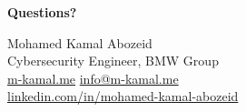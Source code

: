 \begin{frame}[plain]
  \centering
  {\Huge\bfseries\color{tumblue} Questions?}

  \vspace{1cm}
  {\large Mohamed Kamal Abozeid}\\
  {\small Cybersecurity Engineer, BMW Group}\\[4pt]
  {\small \url{m-kamal.me} \;\textbullet\; \href{mailto:info@m-kamal.me}{info@m-kamal.me}}\\[4pt]
  {\small \href{https://www.linkedin.com/in/mohamed-kamal-abozeid-814985b4/}{linkedin.com/in/mohamed-kamal-abozeid}}
\end{frame}
